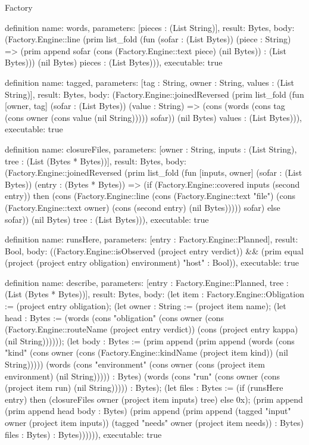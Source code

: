 \begin{lexlean}{Factory}
\begin{semanticmodule}
definition{
  name: words,
  parameters: [pieces : (List String)],
  result: Bytes,
  body: (Factory.Engine::line (prim list_fold (fun (sofar : (List Bytes)) (piece : String) => (prim append sofar (cons (Factory.Engine::text piece) (nil Bytes)) : (List Bytes))) (nil Bytes) pieces : (List Bytes))),
  executable: true
}

definition{
  name: tagged,
  parameters: [tag : String, owner : String, values : (List String)],
  result: Bytes,
  body: (Factory.Engine::joinedReversed (prim list_fold (fun [owner, tag] (sofar : (List Bytes)) (value : String) => (cons (words (cons tag (cons owner (cons value (nil String))))) sofar)) (nil Bytes) values : (List Bytes))),
  executable: true
}

definition{
  name: closureFiles,
  parameters: [owner : String, inputs : (List String), tree : (List (Bytes * Bytes))],
  result: Bytes,
  body: (Factory.Engine::joinedReversed (prim list_fold (fun [inputs, owner] (sofar : (List Bytes)) (entry : (Bytes * Bytes)) => (if (Factory.Engine::covered inputs (second entry)) then (cons (Factory.Engine::line (cons (Factory.Engine::text "file") (cons (Factory.Engine::text owner) (cons (second entry) (nil Bytes))))) sofar) else sofar)) (nil Bytes) tree : (List Bytes))),
  executable: true
}

definition{
  name: runsHere,
  parameters: [entry : Factory.Engine::Planned],
  result: Bool,
  body: ((Factory.Engine::isObserved (project entry verdict)) && (prim equal (project (project entry obligation) environment) "host" : Bool)),
  executable: true
}

definition{
  name: describe,
  parameters: [entry : Factory.Engine::Planned, tree : (List (Bytes * Bytes))],
  result: Bytes,
  body: (let item : Factory.Engine::Obligation := (project entry obligation); (let owner : String := (project item name); (let head : Bytes := (words (cons "obligation" (cons owner (cons (Factory.Engine::routeName (project entry verdict)) (cons (project entry kappa) (nil String)))))); (let body : Bytes := (prim append (prim append (words (cons "kind" (cons owner (cons (Factory.Engine::kindName (project item kind)) (nil String))))) (words (cons "environment" (cons owner (cons (project item environment) (nil String))))) : Bytes) (words (cons "run" (cons owner (cons (project item run) (nil String))))) : Bytes); (let files : Bytes := (if (runsHere entry) then (closureFiles owner (project item inputs) tree) else 0x); (prim append (prim append head body : Bytes) (prim append (prim append (tagged "input" owner (project item inputs)) (tagged "needs" owner (project item needs)) : Bytes) files : Bytes) : Bytes)))))),
  executable: true
}


\end{semanticmodule}
\end{lexlean}
